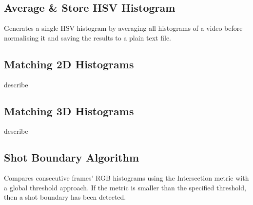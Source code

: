


\subsection{Average \& Store HSV Histogram}
\label{sec:code-generate_and_store_average_hsv_histogram}

Generates a single HSV histogram by averaging all histograms of a video before normalising it and saving the results to a plain text file.




\subsection{Matching 2D Histograms}
\label{sec:code-match_2D_histograms}

describe




\subsection{Matching 3D Histograms}
\label{sec:code-match_3D_histograms}

describe




\subsection{Shot Boundary Algorithm}
\label{sec:code-shot_boundary_detection}

Compares consecutive frames' RGB histograms using the Intersection metric with a global threshold approach. If the metric is smaller than the specified threshold, then a shot boundary has been detected.




